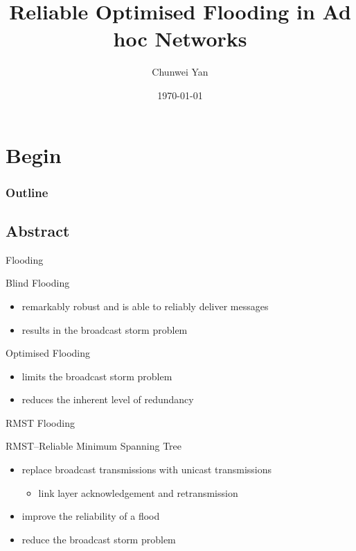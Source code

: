 \documentclass{beamer}
\title{Reliable Optimised Flooding in Ad hoc Networks}
\author{Chunwei Yan}
\institute[PKUSZ]{
\texttt{YanChunwei@outlook.com}
}
\date{\today}
\begin{document}
\begin{frame}
  \titlepage
\end{frame}

\section{Begin}
\begin{frame}
\frametitle{Outline}
\tableofcontents
\end{frame}


\subsection{Abstract}
\begin{frame}{Flooding}
    \begin{block}{Blind Flooding}
        \begin{itemize}
        \pause
        \item remarkably robust and is able to reliably deliver messages
        \pause
        \item results in the broadcast storm problem
        \end{itemize}
    \end{block}

        \pause
    \begin{block}{Optimised Flooding}
        \begin{itemize}
        \pause
        \item limits the broadcast storm problem
        \pause
        \item reduces the inherent level of redundancy
        \end{itemize}
    \end{block}
\end{frame}
\begin{frame}{RMST Flooding}
    \begin{block}{RMST--Reliable Minimum Spanning Tree}
        \begin{itemize}
        \pause
        \item replace broadcast transmissions with unicast transmissions
        \pause
            \begin{itemize}
            \item link layer acknowledgement and retransmission
            \end{itemize}
        \item improve the reliability of a flood
        \pause
        \item reduce the broadcast storm problem
        \end{itemize}
    \end{block}
\end{frame}
\end{document}
